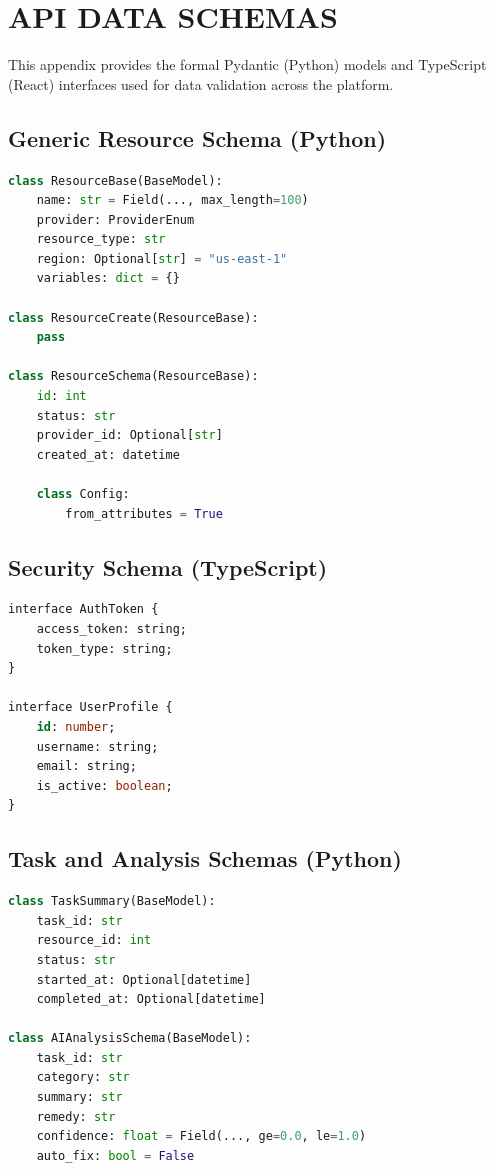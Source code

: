 \chapter{API DATA SCHEMAS}

This appendix provides the formal Pydantic (Python) models and TypeScript (React) interfaces used for data validation across the platform.

\section{Generic Resource Schema (Python)}
\begin{lstlisting}[language=Python]
class ResourceBase(BaseModel):
    name: str = Field(..., max_length=100)
    provider: ProviderEnum
    resource_type: str
    region: Optional[str] = "us-east-1"
    variables: dict = {}

class ResourceCreate(ResourceBase):
    pass

class ResourceSchema(ResourceBase):
    id: int
    status: str
    provider_id: Optional[str]
    created_at: datetime

    class Config:
        from_attributes = True
\end{lstlisting}

\section{Security Schema (TypeScript)}
\begin{lstlisting}[language=SQL]
interface AuthToken {
    access_token: string;
    token_type: string;
}

interface UserProfile {
    id: number;
    username: string;
    email: string;
    is_active: boolean;
}
\end{lstlisting}

\section{Task and Analysis Schemas (Python)}
\begin{lstlisting}[language=Python]
class TaskSummary(BaseModel):
    task_id: str
    resource_id: int
    status: str
    started_at: Optional[datetime]
    completed_at: Optional[datetime]

class AIAnalysisSchema(BaseModel):
    task_id: str
    category: str
    summary: str
    remedy: str
    confidence: float = Field(..., ge=0.0, le=1.0)
    auto_fix: bool = False
\end{lstlisting}

